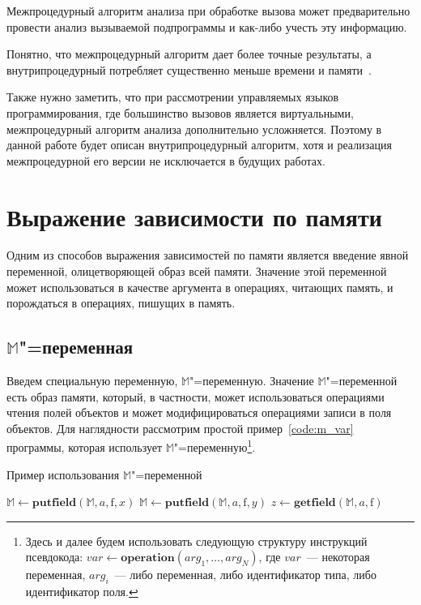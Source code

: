 \documentclass[14pt,titlepage,draft]{extarticle}
\newcommand{\M}{\ensuremath{\mathbb{M}}}
\newcommand{\field}[1]{\mathrm{#1}}
\newcommand{\op}[1]{\mathbf{#1}}
\begin{document}
    Межпроцедурный алгоритм анализа при обработке вызова может предварительно
    провести анализ вызываемой подпрограммы и как-либо учесть эту информацию.

    Понятно, что межпроцедурный алгоритм дает более точные результаты,
    а внутрипроцедурный потребляет существенно меньше времени и
    памяти~\cite[с.~117]{andersen}.

    Также нужно заметить, что при рассмотрении управляемых языков
    программирования, где большинство вызовов является виртуальными,
    межпроцедурный алгоритм анализа дополнительно усложняется. Поэтому в
    данной работе будет описан внутрипроцедурный алгоритм, хотя и реализация
    межпроцедурной его версии не исключается в будущих работах.

  \section{Выражение зависимости по памяти}
    \label{section:m_variable}

    Одним из способов выражения зависимостей по памяти является введение
    явной переменной, олицетворяющей образ всей памяти. Значение этой
    переменной может использоваться в качестве аргумента в операциях, читающих
    память, и порождаться в операциях, пишущих в память.

  \subsection{\texorpdfstring{\M}{M}"=переменная}

    Введем специальную переменную, \M"=переменную. Значение \M"=переменной
    есть образ памяти, который, в частности, может использоваться операциями
    чтения полей объектов и может модифицироваться операциями записи в поля
    объектов. Для наглядности рассмотрим простой пример~\ref{code:m_var}
    программы, которая использует \M"=переменную\footnote{
      Здесь и далее будем использовать следующую структуру инструкций
      псевдокода: $var \gets \op{operation}(arg_1, \ldots, arg_N)$, где
      $var$~--- некоторая переменная, $arg_i$~--- либо переменная, либо
      идентификатор типа, либо идентификатор поля.}.

    \begin{algorithm}
      \caption{Пример использования \M"=переменной}
      \label{code:m_var}
      \begin{algorithmic}[1]
        \If{\ldots}
          \State $\M \gets \op{putfield}(\M, a, \field{f}, x)$
        \Else
          \State $\M \gets \op{putfield}(\M, a, \field{f}, y)$
        \EndIf
        \State $z \gets \op{getfield}(\M, a, \field{f})$
      \end{algorithmic}
    \end{algorithm}
\end{document}
